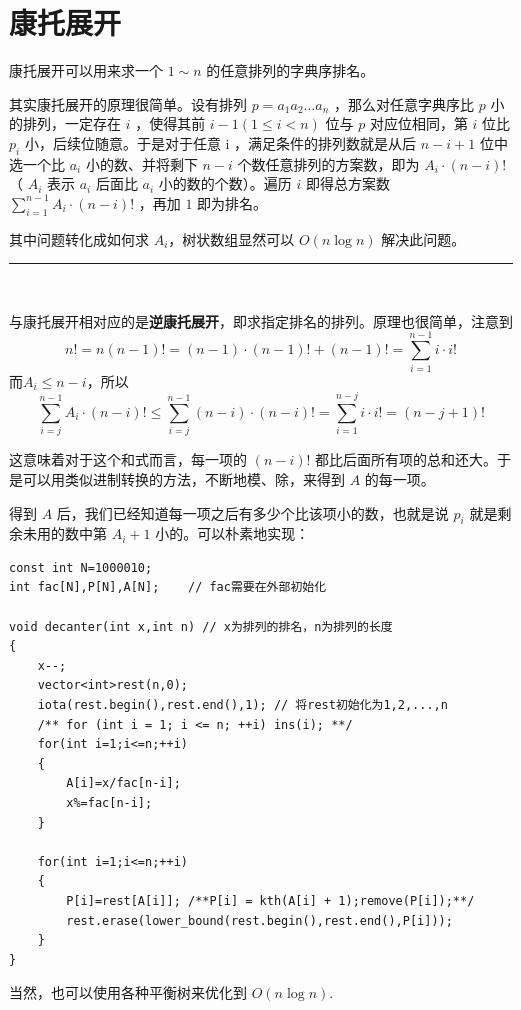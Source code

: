 \section{康托展开}
\par \noindent 康托展开可以用来求一个 $1\sim n$ 的任意排列的字典序排名。
~\\
\par \noindent 其实康托展开的原理很简单。设有排列 $p=a_1a_2…a_n$ ，那么对任意字典序比 $p$ 小的排列，一定存在 $i$ ，使得其前 $i−1 (1\leq i<n)$ 位与 $p$ 对应位相同，第 $i$ 位比 $p_i$ 小，后续位随意。于是对于任意 i ，满足条件的排列数就是从后 $n−i+1$ 位中选一个比 $a_i$ 小的数、并将剩下 $n−i$ 个数任意排列的方案数，即为 $A_i\cdot(n−i)!$ （ $A_i$ 表示 $a_i$ 后面比 $a_i$ 小的数的个数）。遍历 $i$ 即得总方案数$\sum_{i=1}^{n−1}A_i\cdot(n−i)!$ ，再加 $1$ 即为排名。
~\\
\par \noindent 其中问题转化成如何求 $A_i$，树状数组显然可以 $O(n\log n)$ 解决此问题。 
\par \noindent \rule[-10pt]{17.5cm}{0.05em}
~\\
\par \noindent 与康托展开相对应的是\textbf{逆康托展开}，即求指定排名的排列。原理也很简单，注意到
$$
n!=n(n-1)!=(n-1)\cdot(n-1)! + (n-1)! = \sum_{i=1}^{n-1}i\cdot i!
$$
而$A_i\leq n-i$，所以
$$
\sum_{i=j}^{n-1}A_i\cdot (n-i)!\leq\sum_{i=j}^{n-1}(n-i)\cdot (n-i)!=\sum_{i=1}^{n-j}i\cdot i!=(n-j+1)!
$$
\par \noindent 这意味着对于这个和式而言，每一项的 $(n−i)!$ 都比后面所有项的总和还大。于是可以用类似进制转换的方法，不断地模、除，来得到 $A$ 的每一项。
~\\
\par \noindent 得到 $A$ 后，我们已经知道每一项之后有多少个比该项小的数，也就是说 $p_i$ 就是剩余未用的数中第 $A_{i}+1$ 小的。可以朴素地实现：
\begin{verbatim}
const int N=1000010;
int fac[N],P[N],A[N];    // fac需要在外部初始化

void decanter(int x,int n) // x为排列的排名，n为排列的长度
{
    x--;
    vector<int>rest(n,0);
    iota(rest.begin(),rest.end(),1); // 将rest初始化为1,2,...,n
    /** for (int i = 1; i <= n; ++i) ins(i); **/
    for(int i=1;i<=n;++i)
    {
        A[i]=x/fac[n-i];
        x%=fac[n-i];
    }

    for(int i=1;i<=n;++i)
    {
        P[i]=rest[A[i]]; /**P[i] = kth(A[i] + 1);remove(P[i]);**/
        rest.erase(lower_bound(rest.begin(),rest.end(),P[i]));
    }
}
\end{verbatim}

\par \noindent 当然，也可以使用各种平衡树来优化到 $O(n\log n)$.